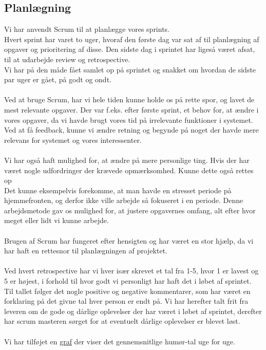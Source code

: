 \subsection{Planlægning}
Vi har anvendt Scrum til at planlægge vores sprints.
\\
Hvert sprint har varet to uger, hvoraf den første dag var sat af til planlægning af opgaver og prioritering af disse.
Den sidste dag i sprintet har ligeså været afsat, til at udarbejde review og retrospective.
\\
Vi har på den måde fået samlet op på sprintet og snakket om hvordan de sidste par uger er gået, på godt og ondt.
\\\\
Ved at bruge Scrum, har vi hele tiden kunne holde os på rette spor, og lavet de mest relevante opgaver.
Der var f.eks. efter første sprint, et behov for, at ændre i vores opgaver, da vi havde brugt vores tid på irrelevante funktioner i systemet.
Ved at få feedback, kunne vi ændre retning og begynde på noget der havde mere relevans for systemet og vores interessenter.
\\\\
Vi har også haft mulighed for, at ændre på mere personlige ting. Hvis der har været nogle udfordringer der krævede opmærksomhed.
Kunne dette også rettes op
\\
Det kunne eksempelvis forekomme, at man havde en stresset periode på hjemmefronten, og derfor ikke ville arbejde så fokuseret i en periode.
Denne arbejdsmetode gav os mulighed for, at justere opgavernes omfang, alt efter hvor meget eller lidt vi kunne arbejde.
\\\\
Brugen af Scrum har fungeret efter hensigten og har været en stor hjælp, da vi har haft en rettesnor til planlægningen af projektet.
\\\\
Ved hvert retrospective har vi hver især skrevet et tal fra 1-5, hvor 1 er lavest og 5 er højest, i forhold til hvor godt vi personligt har haft det i løbet af sprintet.
Til tallet følger det nogle positive og negative kommentarer, som har været en forklaring på det givne tal hver person er endt på.
Vi har herefter talt frit fra leveren om de gode og dårlige oplevelser der har været i løbet af sprintet, derefter har scrum masteren sørget for at
eventuelt dårlige oplevelser er blevet løst.
\\\\
Vi har tilføjet en \hyperref[fig:happi]{graf} der viser det gennemsnitlige humør-tal uge for uge.
